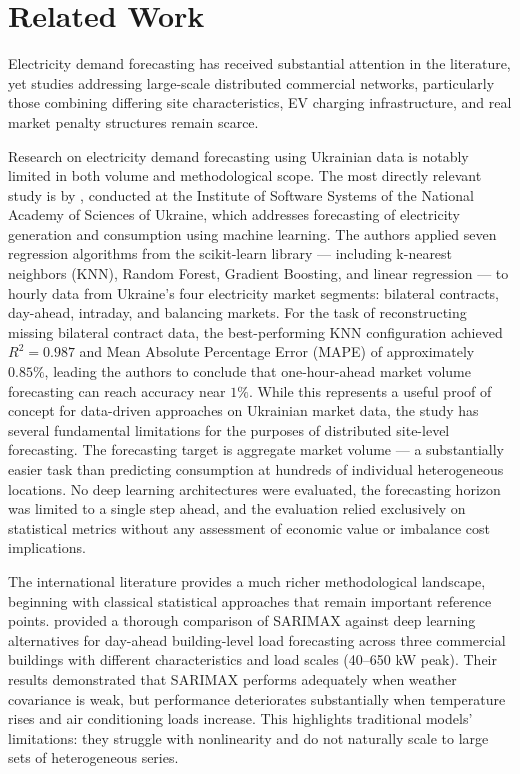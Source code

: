 

\chapter{Related Work}
\label{chap:related_work}

Electricity demand forecasting has received substantial attention in the literature,
yet studies addressing large-scale distributed commercial networks, particularly those
combining differing site characteristics, EV charging infrastructure, and real market
penalty structures remain scarce.

Research on electricity demand forecasting using Ukrainian data is notably limited in
both volume and methodological scope. The most directly relevant study is by
\citet{sinitsyn2023}, conducted at the Institute of Software Systems of the National
Academy of Sciences of Ukraine, which addresses forecasting of electricity generation
and consumption using machine learning. The authors applied seven regression algorithms
from the scikit-learn library --- including k-nearest neighbors (KNN), Random Forest, Gradient
Boosting, and linear regression --- to hourly data from Ukraine's four electricity market
segments: bilateral contracts, day-ahead, intraday, and balancing markets. For the task
of reconstructing missing bilateral contract data, the best-performing KNN configuration
achieved $R^2 = 0.987$ and Mean Absolute Percentage Error (MAPE) of approximately $0.85\%$, leading the authors to
conclude that one-hour-ahead market volume forecasting can reach accuracy near $1\%$.
While this represents a useful proof of concept for data-driven approaches on Ukrainian
market data, the study has several fundamental limitations for the purposes of distributed
site-level forecasting. The forecasting target is aggregate market volume --- a
substantially easier task than predicting consumption at hundreds of individual
heterogeneous locations. No deep learning architectures were evaluated, the forecasting
horizon was limited to a single step ahead, and the evaluation relied exclusively on
statistical metrics without any assessment of economic value or imbalance cost
implications.

The international literature provides a much richer methodological landscape, beginning
with classical statistical approaches that remain important reference points.
\citet{cai2019} provided a thorough comparison of SARIMAX against deep learning
alternatives for day-ahead building-level load forecasting across three commercial
buildings with different characteristics and load scales (40--650 kW peak). Their results
demonstrated that SARIMAX performs adequately when weather covariance is weak, but
performance deteriorates substantially when temperature rises and air conditioning loads
increase. This highlights traditional models' limitations: they struggle with
nonlinearity and do not naturally scale to large sets of heterogeneous series.

